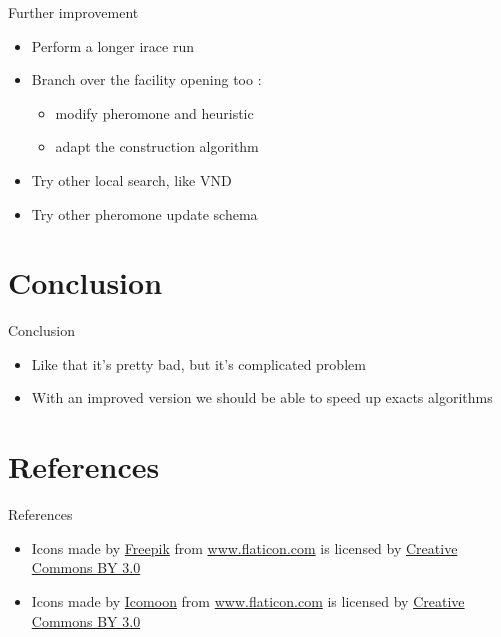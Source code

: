 \documentclass{beamer}
\begin{document}
\begin{frame}{Further improvement}
\begin{itemize}
\item
Perform a longer irace run
\item
Branch over the facility opening too :
\begin{itemize}
\item
modify pheromone and heuristic
\item
adapt the construction algorithm
\end{itemize}
\item
Try other local search, like VND
\item
Try other pheromone update schema

\end{itemize}
\end{frame}

\section*{Conclusion}

\begin{frame}{Conclusion}
\begin{itemize}
\item
Like that it's pretty bad, but it's complicated problem
\item
With an improved version we should be able to speed up exacts algorithms
\end{itemize}
\end{frame}

\section{References}

\begin{frame}{References}

\begin{itemize}

    \item Icons made by \href{http://www.freepik.com}{Freepik} from \href{http://www.flaticon.com}{www.flaticon.com} is licensed by \href{http://creativecommons.org/licenses/by/3.0/}{Creative Commons BY 3.0}

    \item Icons made by \href{http://www.flaticon.com/authors/icomoon}{Icomoon} from \href{http://www.flaticon.com}{www.flaticon.com} is licensed by \href{http://creativecommons.org/licenses/by/3.0/}{Creative Commons BY 3.0}

\end{itemize}

\end{frame}
\end{document}
